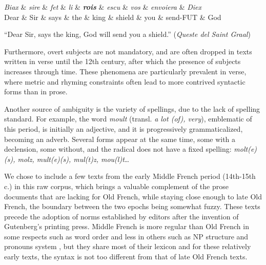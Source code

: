 \begin{center}
    \begin{dependency}[theme=simple]
        \begin{deptext}[row 2/.style={font=\small}]
            \textit{Biax} \& \textit{sire} \& \textit{fet} \& \textit{li} \& \textbf{\textit{rois}} \& \textit{escu} \& \textit{vos} \& \textit{envoiera} \& \textit{Diex} \\
            Dear \& Sir \& says \& the \& king \& shield \& you \& send-FUT \& God \\
        \end{deptext}
    \end{dependency}

    \raggedright
    \enquote{Dear Sir, says the king, God will send you a shield.} (\emph{Queste del Saint Graal})
\end{center}

Furthermore, overt subjects are not mandatory, and are often dropped in texts written in verse until the 12th century, after which the presence of subjects increases through time.
These phenomena are particularly prevalent in verse, where metric and rhyming constraints often lead to more contrived syntactic forms than in prose.

Another source of ambiguity is the variety of spellings, due to the lack of spelling standard. For example, the word \textit{moult} (transl. \textit{a lot (of), very}), emblematic of this period, is initially an adjective, and it is progressively grammaticalized, becoming an adverb. Several forms appear at the same time, some with a declension, some without, and the radical does not have a fixed spelling: \textit{molt(e)(s), molz, mult(e)(s), mul(t)z, mou(l)t}…

We chose to include a few texts from the early Middle French period (14th-15th c.) in this raw corpus, which brings a valuable complement of the prose documents that are lacking for Old French, while staying close enough to late Old French, the boundary between the two epochs being somewhat fuzzy.
These texts precede the adoption of norms established by editors after the invention of Gutenberg's printing press. Middle French is more regular than Old French in some respects such as word order \citep{marchello-Nizia-etal-2020-grande} and less in others such as NP structure and pronouns system \citep{marchello-nizia-etal-1979-histoire}, but they share most of their lexicon and for these relatively early texts, the syntax is not too different from that of late Old French texts.

